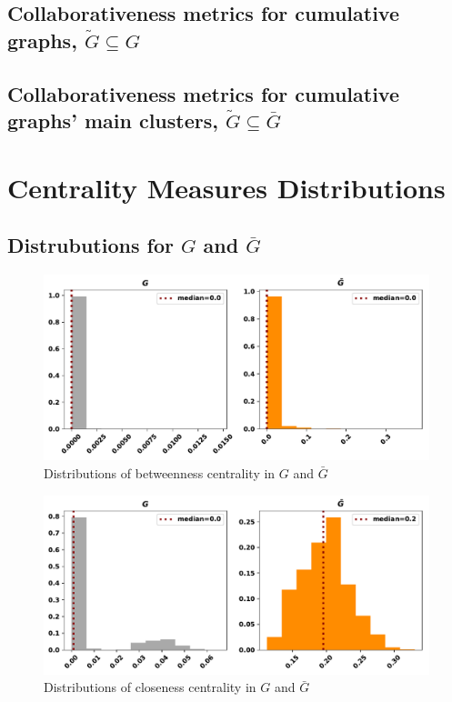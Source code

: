 \documentclass{article}
\theoremstyle{definition}
\begin{document}
\subsection{Collaborativeness metrics for cumulative graphs, \(\tilde{G} \subseteq G\)}
\begin{table}[!hbtp]
    \centering
    \resizebox{.8\textwidth}{!}{
    }
\end{table}

\newpage

\subsection{Collaborativeness metrics for cumulative graphs' main clusters, \(\tilde{G} \subseteq \bar{G}\)}
\begin{table}[!hbtp]
    \centering
    \resizebox{.8\textwidth}{!}{
    }
\end{table}


\section{Centrality Measures Distributions}

\subsection{Distrubutions for \(G\) and \(\bar{G}\)}

\begin{figure}[!hbtp]
    \centering
    \includegraphics[width=.8\textwidth]{./assets/images/pd_betweeness_centralities.pdf}
    \caption{Distributions of betweenness centrality in \(G\) and \(\bar{G}\)}
    \label{fig:bc_distributions}
\end{figure}

\begin{figure}[!hbtp]
    \centering
    \includegraphics[width=.8\textwidth]{./assets/images/pd_closeness_centralities.pdf}
    \caption{Distributions of closeness centrality in \(G\) and \(\bar{G}\)}
    \label{fig:cc_distributions}
\end{figure}
\end{document}
